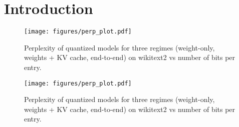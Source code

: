 \section{Introduction}

\ifisicml
\begin{figure}[h]
    \centering
    \texttt{[image: figures/perp\_plot.pdf]}
    \caption{Perplexity of quantized models for three regimes (weight-only, weights + KV cache, end-to-end) on wikitext2 vs number of bits per entry.}
    \label{fig:main-plot}
\end{figure}

\else
\begin{wrapfigure}{r}{0.5\textwidth}
  \begin{center}
    \texttt{[image: figures/perp\_plot.pdf]}
  \end{center}
  \caption{Perplexity of quantized models for three regimes (weight-only, weights + KV cache, end-to-end) on wikitext2 vs number of bits per entry.}
  \vspace{-5ex}
\label{fig:main-plot}
\end{wrapfigure}

\fi

